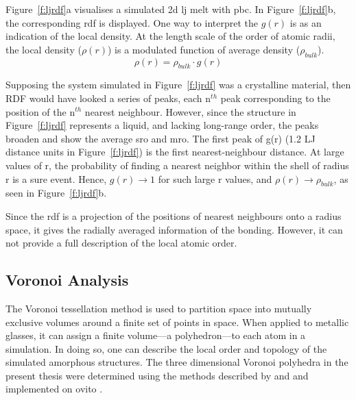 Figure~\ref{f:ljrdf}a visualises a simulated \acrlong{2d} \gls{lj} melt with \gls{pbc}. In Figure~\ref{f:ljrdf}b, the corresponding \gls{rdf} is displayed. One way to interpret the $g(r)$ is as an indication of the local density. At the length scale of the order of atomic radii, the local density ($\rho (r)$) is a modulated function of average density ($\rho_{bulk}$). \begin{equation} \rho (r) = \rho_{bulk} \cdot g(r) \end{equation}

Supposing the system simulated in Figure~\ref{f:ljrdf} was a crystalline material, then RDF would have looked a series of peaks, each n$^{th}$ peak corresponding to the position of the n$^{th}$ nearest neighbour. However, since the structure in Figure~\ref{f:ljrdf} represents a liquid, and lacking long-range order, the peaks broaden and show the average \gls{sro} and \gls{mro}. The first peak of g(r) (1.2 LJ distance units in Figure~\ref{f:ljrdf}) is the first nearest-neighbour distance. At large values of r, the probability of finding a nearest neighbor within the shell of radius r is a sure event. Hence, $g(r)\rightarrow 1$ for such large r values, and $ \rho (r) \rightarrow \rho_{bulk} $, as seen in Figure~\ref{f:ljrdf}b. \par 

Since the \gls{rdf} is a projection of the positions of nearest neighbours onto a radius space, it gives the radially averaged information of the bonding. However, it can not provide a full description of the local atomic order. \par


\subsection{Voronoi Analysis} \label{s:voronoi}
The Voronoi tessellation method is used to partition space into mutually exclusive volumes around a finite set of points in space. When applied to metallic glasses, it can assign a finite volume---a polyhedron---to each atom in a simulation. In doing so, one can describe the local order and topology of the simulated amorphous structures. The three dimensional Voronoi polyhedra in the present thesis were determined using the methods described by \textcite{Brostow1978,Brostow1998} and \textcite{Borodin1999} and implemented on \gls{ovito} \cite{Stukowski2010a}. \par

